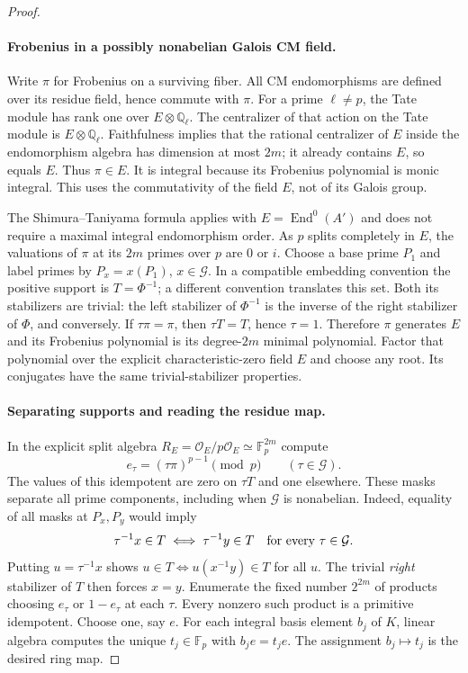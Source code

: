 \documentclass[11pt]{article}
\theoremstyle{definition}
\theoremstyle{remark}
\begin{document}
\begin{proof}
\paragraph{Frobenius in a possibly nonabelian Galois CM field.}
Write $\pi$ for Frobenius on a surviving fiber.  All CM endomorphisms are
defined over its residue field, hence commute with $\pi$.  For a prime
$\ell\ne p$, the Tate module has rank one over $E\otimes\mathbb Q_\ell$.
The centralizer of that action on the Tate module is
$E\otimes\mathbb Q_\ell$.  Faithfulness implies that the rational
centralizer of $E$ inside the endomorphism algebra has dimension at most
$2m$; it already contains $E$, so equals $E$.  Thus $\pi\in E$.
It is integral because its Frobenius polynomial is monic integral.
This uses the commutativity of the field $E$, not of its Galois group.

The Shimura--Taniyama formula
\cite[Section 5, p.~64, before Proposition 5.3]{Milne1999} applies with
$E=\operatorname{End}^0(A')$ and does not require a maximal integral
endomorphism order.  As $p$ splits completely in $E$, the valuations of
$\pi$ at its $2m$ primes over $p$ are $0$ or $i$.  Choose a base prime
$P_1$ and label primes by $P_x=x(P_1)$, $x\in\mathcal G$.  In a compatible
embedding convention the positive support is $T=\Phi^{-1}$; a different
convention translates this set.  Both its stabilizers are trivial:
the left stabilizer of $\Phi^{-1}$ is the inverse of the right stabilizer
of $\Phi$, and conversely.  If $\tau\pi=\pi$, then $\tau T=T$, hence
$\tau=1$.  Therefore $\pi$ generates $E$ and its Frobenius polynomial is
its degree-$2m$ minimal polynomial.  Factor that polynomial over the explicit
characteristic-zero field $E$ and choose any root.  Its conjugates have the
same trivial-stabilizer properties.

\paragraph{Separating supports and reading the residue map.}
In the explicit split algebra
$R_E=\mathcal O_E/p\mathcal O_E\simeq\mathbb F_p^{2m}$ compute
\[
 e_\tau=(\tau\pi)^{p-1}\pmod p\qquad(\tau\in\mathcal G).
\]
The values of this idempotent are zero on $\tau T$ and one elsewhere.
These masks separate all prime components, including when $\mathcal G$ is
nonabelian.  Indeed, equality of all masks at $P_x,P_y$ would imply
\[
 \tau^{-1}x\in T\iff\tau^{-1}y\in T\quad\hbox{for every }\tau\in\mathcal G.
\]
Putting $u=\tau^{-1}x$ shows
$u\in T\iff u(x^{-1}y)\in T$ for all $u$.  The trivial \emph{right}
stabilizer of $T$ then forces $x=y$.
Enumerate the fixed number $2^{2m}$ of products choosing $e_\tau$ or
$1-e_\tau$ at each $\tau$.  Every nonzero such product is a primitive
idempotent.  Choose one, say $e$.  For each integral basis element $b_j$ of
$K$, linear algebra computes the unique $t_j\in\mathbb F_p$ with
$b_je=t_je$.  The assignment $b_j\mapsto t_j$ is the desired ring map.


\end{proof}
\end{document}
